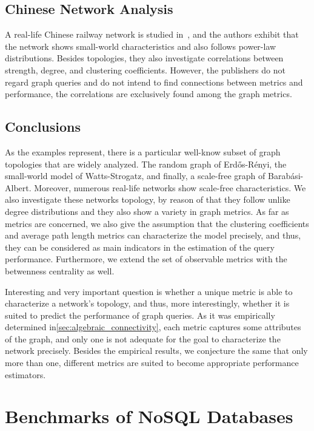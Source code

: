 \subsection{Chinese Network Analysis}
A real-life Chinese railway network is studied in~\cite{chinese}, and the authors exhibit that the network shows small-world characteristics and also follows power-law distributions. Besides topologies, they also investigate correlations between strength, degree, and clustering coefficients. However, the publishers do not regard graph queries and do not intend to find connections between metrics and performance, the correlations are exclusively found among the graph metrics.

\subsection{Conclusions}

As the examples represent, there is a particular well-know subset of graph topologies that are widely analyzed. The random graph of Erdős-Rényi, the small-world model of Watts-Strogatz, and finally, a scale-free graph of Barabási-Albert. Moreover, numerous real-life networks show scale-free characteristics. We also investigate these networks topology, by reason of that they follow unlike degree distributions and they also show a variety in graph metrics. As far as metrics are concerned, we also give the assumption that the clustering coefficients and average path length metrics can characterize the model precisely, and thus, they can be considered as main indicators in the estimation of the query performance. Furthermore, we extend the set of observable metrics with the betwenness centrality as well.

Interesting and very important question is whether a unique metric is able to characterize a network's topology, and thus, more interestingly, whether it is suited to predict the performance of graph queries. As it was empirically determined in\ref{sec:algebraic_connectivity}, each metric captures some attributes of the graph, and only one is not adequate for the goal to characterize the network precisely. Besides the empirical results, we conjecture the same that only more than one, different metrics are suited to become appropriate performance estimators.


\section{Benchmarks of NoSQL Databases}


